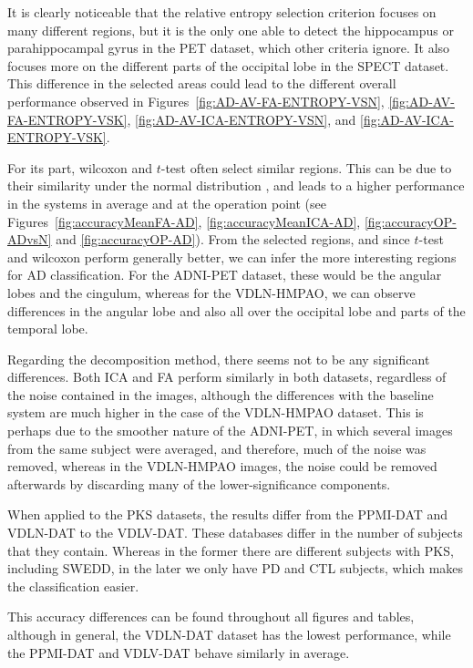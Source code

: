 It is clearly noticeable that the relative entropy selection criterion focuses on many different regions, but it is the only one able to detect the hippocampus or parahippocampal gyrus in the \ac{PET} dataset, which other criteria ignore. It also focuses more on the different parts of the occipital lobe in the \ac{SPECT} dataset. This difference in the selected areas could lead to the different overall performance observed in Figures~\ref{fig:AD-AV-FA-ENTROPY-VSN}, \ref{fig:AD-AV-FA-ENTROPY-VSK}, \ref{fig:AD-AV-ICA-ENTROPY-VSN}, and \ref{fig:AD-AV-ICA-ENTROPY-VSK}.

For its part, wilcoxon and $t$-test often select similar regions. This can be due to their similarity under the normal distribution \cite{Fay10}, and leads to a higher performance in the systems in average and at the operation point (see Figures~\ref{fig:accuracyMeanFA-AD}, \ref{fig:accuracyMeanICA-AD}, \ref{fig:accuracyOP-ADvsN} and \ref{fig:accuracyOP-AD}). From the selected regions, and since $t$-test and wilcoxon perform generally better, we can infer the more interesting regions for \ac{AD} classification. For the ADNI-PET dataset, these would be the angular lobes and the cingulum, whereas for the VDLN-HMPAO, we can observe differences in the angular lobe and also all over the occipital lobe and parts of the temporal lobe. 

Regarding the decomposition method, there seems not to be any significant differences. Both \ac{ICA} and \ac{FA} perform similarly in both datasets, regardless of the noise contained in the images, although the differences with the baseline system are much higher in the case of the VDLN-HMPAO dataset. This is perhaps due to the smoother nature of the ADNI-PET, in which several images from the same subject were averaged, and therefore, much of the noise was removed, whereas in the VDLN-HMPAO images, the noise could be removed afterwards by discarding many of the lower-significance components. 

When applied to the \ac{PKS} datasets, the results differ from the PPMI-DAT and VDLN-DAT to the VDLV-DAT. These databases differ in the number of subjects that they contain. Whereas in the former there are different subjects with \ac{PKS}, including \ac{SWEDD}, in the later we only have \ac{PD} and \ac{CTL} subjects, which makes the classification easier. 

This accuracy differences can be found throughout all figures and tables, although in general, the VDLN-DAT dataset has the lowest performance, while the PPMI-DAT and VDLV-DAT behave similarly in average. 

